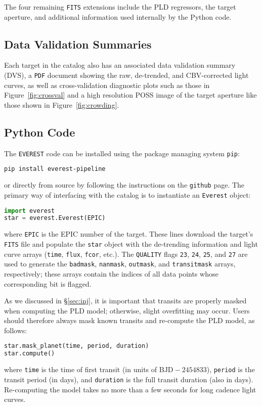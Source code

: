 \documentclass[]{emulateapj}
\begin{document}
The four remaining \texttt{FITS} extensions include the PLD regressors, the target aperture, 
and additional information used internally by the Python code.

\subsection{Data Validation Summaries}
\label{sec:dvs}
Each target in the catalog also has an associated data validation summary (DVS), a
\texttt{PDF} document showing the raw, de-trended, and CBV-corrected light curves, 
as well as cross-validation diagnostic plots such as those in Figure~\ref{fig:crossval}
and a high resolution POSS image of the target aperture like those shown in 
Figure~\ref{fig:crowding}.

\subsection{Python Code}
\label{sec:python}
The \texttt{EVEREST} code can be installed using the package managing system \texttt{pip}:
%
\begin{lstlisting}[language=bash]
pip install everest-pipeline
\end{lstlisting}
%
or directly from source by following the instructions on the \texttt{github} page. 
The primary way of interfacing
with the catalog is to instantiate an \texttt{Everest} object:
%
\begin{lstlisting}[language=Python]
import everest
star = everest.Everest(EPIC)
\end{lstlisting}
%
where \texttt{EPIC} is the EPIC number of the target. These lines download the
target's \texttt{FITS} file and populate
the \texttt{star} object with the de-trending information and light curve arrays
(\texttt{time}, \texttt{flux}, \texttt{fcor}, etc.).
The \texttt{QUALITY} flags \texttt{23}, \texttt{24}, \texttt{25}, and \texttt{27} are 
used to generate the \texttt{badmask}, \texttt{nanmask}, \texttt{outmask}, and 
\texttt{transitmask} arrays, respectively; these arrays contain the indices of all
data points whose corresponding bit is flagged.

As we discussed in \S\ref{sec:inj}, it is important that transits are properly masked
when computing the PLD model; otherwise, slight overfitting may occur. Users should 
therefore always mask known transits and re-compute the PLD model, as follows:
%
\begin{lstlisting}[language=Python]
star.mask_planet(time, period, duration)
star.compute()
\end{lstlisting}
%
where \texttt{time} is the time of first transit (in units of $\mathrm{BJD} - 2454833$),
\texttt{period} is the transit period (in days), and \texttt{duration} is the full
transit duration (also in days). Re-computing the model takes no more than 
a few seconds for long cadence light curves.
\end{document}
